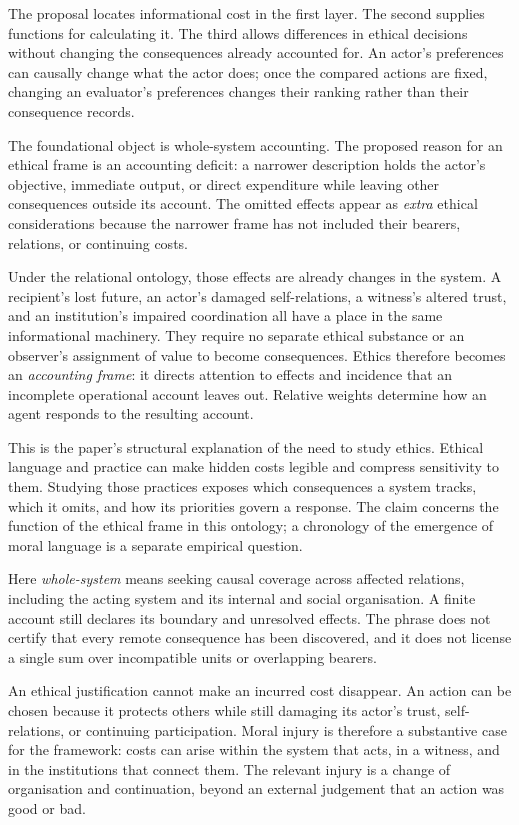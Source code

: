 \documentclass[11pt,a4paper]{article}
\theoremstyle{remark}
\begin{document}
The proposal locates informational cost in the first layer. The second supplies
functions for calculating it. The third allows differences in ethical decisions
without changing the consequences already accounted for. An actor's preferences
can causally change what the actor does; once the compared actions are fixed,
changing an evaluator's preferences changes their ranking rather than their
consequence records.

The foundational object is whole-system accounting. The proposed reason for an
ethical frame is an accounting deficit: a narrower description holds the actor's
objective, immediate output, or direct expenditure while leaving other
consequences outside its account. The omitted effects appear as \emph{extra}
ethical considerations because the narrower frame has not included their
bearers, relations, or continuing costs.

Under the relational ontology, those effects are already changes in the system.
A recipient's lost future, an actor's damaged self-relations, a witness's altered
trust, and an institution's impaired coordination all have a place in the same
informational machinery. They require no separate ethical substance or an
observer's assignment of value to become consequences. Ethics therefore becomes
an \emph{accounting frame}: it directs attention to effects and incidence that
an incomplete operational account leaves out. Relative weights determine how
an agent responds to the resulting account.

This is the paper's structural explanation of the need to study ethics. Ethical
language and practice can make hidden costs legible and compress sensitivity to
them. Studying those practices exposes which consequences a system tracks,
which it omits, and how its priorities govern a response. The claim concerns the
function of the ethical frame in this ontology; a chronology of the emergence
of moral language is a separate empirical question.

Here \emph{whole-system} means seeking causal coverage across affected relations,
including the acting system and its internal and social organisation. A finite
account still declares its boundary and unresolved effects. The phrase does not
certify that every remote consequence has been discovered, and it does not
license a single sum over incompatible units or overlapping bearers.

An ethical justification cannot make an incurred cost disappear. An action can
be chosen because it protects others while still damaging its actor's trust,
self-relations, or continuing participation. Moral injury is therefore a
substantive case for the framework: costs can arise within the system that acts,
in a witness, and in the institutions that connect them. The relevant injury
is a change of organisation and continuation, beyond an external judgement that
an action was good or bad.
\end{document}
